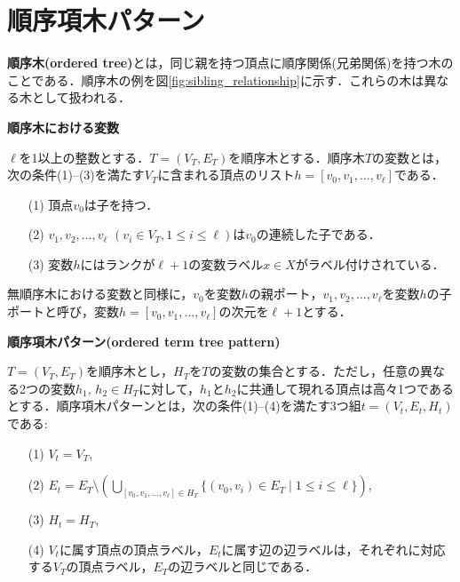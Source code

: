 \section{順序項木パターン}
\textbf{順序木(ordered tree)}とは，同じ親を持つ頂点に順序関係(兄弟関係)を持つ木のことである．順序木の例を図\ref{fig:sibling_relationship}に示す．これらの木は異なる木として扱われる．

\begin{define}{\bf 順序木における変数}\par
  $\ell$を1以上の整数とする．$T=(V_T,E_T)$を順序木とする．順序木$T$の変数とは，次の条件(1)--(3)を満たす$V_T$に含まれる頂点のリスト$h=[v_0,v_1,\ldots,v_{\ell}]$である．
  \begin{enumerate}
    \item[(1)] 頂点$v_0$は子を持つ．
    \item[(2)] $v_1,v_2,\ldots,v_{\ell}$ $(v_i \in V_T, 1\leq i\leq \ell)$は$v_0$の連続した子である．
    \item[(3)] 変数$h$にはランクが$\ell+1$の変数ラベル$x\in X$がラベル付けされている．
  \end{enumerate}
  無順序木における変数と同様に，$v_0$を変数$h$の親ポート，$v_1,v_2,\ldots,v_{\ell}$を変数$h$の子ポートと呼び，変数$h=[v_0,v_1,\ldots,v_{\ell}]$の次元を$\ell+1$とする．
\end{define}

\begin{define}{\bf 順序項木パターン(ordered term tree pattern)}\par
$T=(V_T,E_T)$を順序木とし，$H_T$を$T$の変数の集合とする．ただし，任意の異なる2つの変数$h_1,\,h_2\in H_T$に対して，$h_1$と$h_2$に共通して現れる頂点は高々1つであるとする．順序項木パターンとは，次の条件(1)--(4)を満たす3つ組$t=(V_t,E_t,H_t)$である:
\begin{enumerate}
  \item[(1)] $V_t=V_T$,
  \item[(2)] $E_t=E_T\setminus \left(\bigcup_{[v_0,v_1,\ldots,v_{\ell}]\in H_T}\{(v_0,v_i)\in E_T\mid 1\leq i\leq \ell\}\right)$,
  \item[(3)] $H_t=H_T$,
  \item[(4)] $V_t$に属す頂点の頂点ラベル，$E_t$に属す辺の辺ラベルは，それぞれに対応する$V_T$の頂点ラベル，$E_T$の辺ラベルと同じである．
\end{enumerate}
\end{define}

